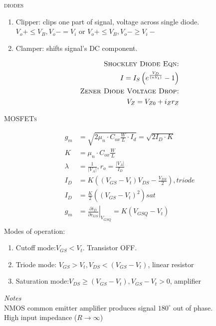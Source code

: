 \documentclass[9pt,letterpaper,english]{article}
\begin{document}
\textsc{diodes}\\
\begin{multicols}{2}
\begin{enumerate}
\item{Clipper: clips one part of signal, voltage across single diode. $V_o+ \leq V_B, V_o- = V_i$ or $V_o+ \leq V_B, V_o- \geq V_i-$}
 \item{Clamper: shifts signal's DC component.}
\end{enumerate}
\begin{align*}
\textsc{Shockley Diode Eqn:}\\
I= I_S\left(e^{\frac{V_D}{\left(nV_t\right)}} - 1\right)\nonumber\\
\textsc{Zener Diode Voltage Drop:}\\
V_{Z} = V_{Z0} + i_Zr_Z\nonumber\\
\end{align*}
\end{multicols}

\textsc{MOSFETs}\\
\begin{multicols}{2}
\begin{align*}
g_m& = \sqrt{2\mu_n \cdot C_{ox}\frac{W}{L} \cdot I_d} = \sqrt{2I_D\cdot K}\\
K&= \mu_n \cdot C_{ox}\frac{W}{L} \\
\lambda&= \frac{1}{|V_A|}, r_o= \frac{|V_A|}{I_D}\\
I_D&= K\left((V_{GS} - V_t)V_{DS} -\frac{V_{DS}}{2}\right),triode\\
I_D&= \frac{K}{2}\left((V_{GS} - V_t)^{2}\right) sat\\
g_m&=\left.\frac{\partial i_D}{\partial v_{GS}} \right|_{V_{GSQ}} = K\left(V_{GSQ} - V_t\right)\nonumber\\
\end{align*}
Modes of operation:
\begin{enumerate}
\item{Cutoff mode:$V_{GS} < V_t$. Transistor OFF.}
\item{Triode mode: $V_{GS} > V_t, V_{DS} < (V_{GS} - V_t)$, linear resistor}
\item{Saturation mode:$V_{DS} \geq (V_{GS} - V_t), V_{GS} - V_t > 0$, amplifier}
\end{enumerate}
\emph{Notes}\\
NMOS common emitter amplifier produces signal $180^\circ$ out of phase.\\
High input impedance ($R\rightarrow \infty$)
\end{multicols}
\end{document}
